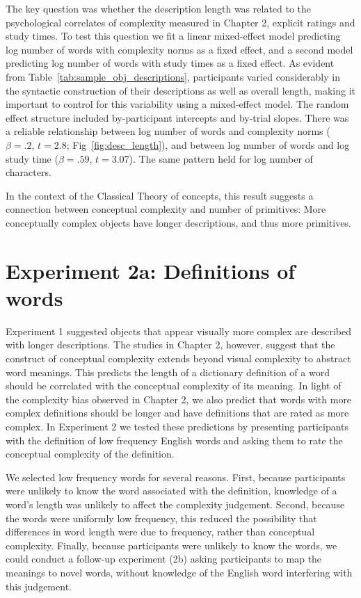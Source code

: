 The key question was whether the description length was related to the psychological correlates of complexity measured in Chapter 2, explicit ratings and study times.
To test this question we fit a  linear mixed-effect model predicting log number of words with complexity norms as a fixed effect, and a second model predicting log number of words with study times as a fixed effect. As evident from Table~\ref{tab:sample_obj_descriptions}, participants varied considerably in the  syntactic construction of their descriptions as well as overall  length, making it important to control for this variability using a  mixed-effect model. The random effect structure included by-participant intercepts and by-trial slopes. There was a reliable relationship between log number of words and  complexity norms ($\beta=.2$, $t =2.8$; Fig~\ref{fig:desc_length}), and between log number of words and log study time ($\beta=.59$, $t =3.07$). The same pattern held for log number of characters. 

In the context of the Classical Theory of concepts, this result suggests a connection between conceptual complexity and number of primitives: More conceptually complex objects have longer descriptions, and thus more primitives. 

\section{Experiment 2a: Definitions of words}
Experiment 1 suggested objects that appear visually more complex are described with longer descriptions. The studies in Chapter 2, however, suggest that the construct of conceptual complexity extends beyond visual complexity to abstract word meanings. This predicts the length of a dictionary definition of a word should be correlated with the conceptual complexity of its meaning. In light of the complexity bias observed in Chapter 2, we also predict that words with more complex definitions should be longer and have definitions that are rated as more complex. In Experiment 2 we tested these predictions by presenting participants with the definition of low frequency English words  and asking them to rate the conceptual complexity of the definition.

We selected low frequency words for several reasons. First, because participants were unlikely to know the word associated with the definition, knowledge of a word's length was unlikely to affect the complexity judgement. Second, because the words were uniformly low frequency, this reduced the possibility that differences in word length were due to frequency, rather than conceptual complexity. Finally, because participants were unlikely to know the words, we could conduct a follow-up experiment (2b) asking participants to map the meanings to novel words, without knowledge of the English word interfering with this judgement.

